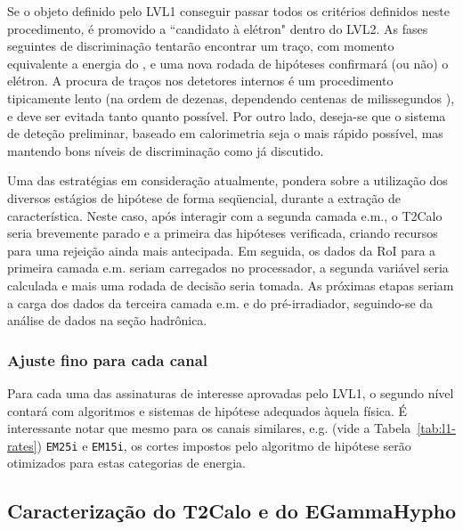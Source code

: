 Se o objeto definido pelo LVL1 conseguir passar todos os critérios definidos
neste procedimento, é promovido a ``candidato à elétron" dentro do LVL2. As
fases seguintes de discriminação tentarão encontrar um traço, com momento
equivalente a energia do , e uma nova rodada de hipóteses
confirmará (ou não) o elétron. A procura de traços nos detetores internos é um
procedimento tipicamente lento (na ordem de dezenas, dependendo centenas de
milissegundos \cite{hlt-tdr}), e deve ser evitada tanto quanto possível. Por
outro lado, deseja-se que o sistema de deteção preliminar, baseado em
calorimetria seja o mais rápido possível, mas mantendo bons níveis de
discriminação como já discutido.

Uma das estratégias em consideração atualmente, pondera sobre a utilização dos
diversos estágios de hipótese de forma seqüencial, durante a extração de
característica. Neste caso, após interagir com a segunda camada e.m., o T2Calo
seria brevemente parado e a primeira das hipóteses verificada, criando
recursos para uma rejeição ainda mais antecipada. Em seguida, os dados da RoI
para a primeira camada e.m. seriam carregados no processador, a segunda
variável seria calculada e mais uma rodada de decisão seria tomada. As
próximas etapas seriam a carga dos dados da terceira camada e.m. e do
pré-irradiador, seguindo-se da análise de dados na seção hadrônica. 

\subsubsection{Ajuste fino para cada canal}

Para cada uma das assinaturas de interesse aprovadas pelo LVL1, o segundo
nível contará com algoritmos e sistemas de hipótese adequados àquela física. É
interessante notar que mesmo para os canais similares, e.g. (vide a
Tabela~\ref{tab:l1-rates}) \texttt{EM25i} e \texttt{EM15i}, os cortes impostos
pelo algoritmo de hipótese serão otimizados para estas categorias de
energia. 


\subsection{Caracterização do T2Calo e do EGammaHypho}

